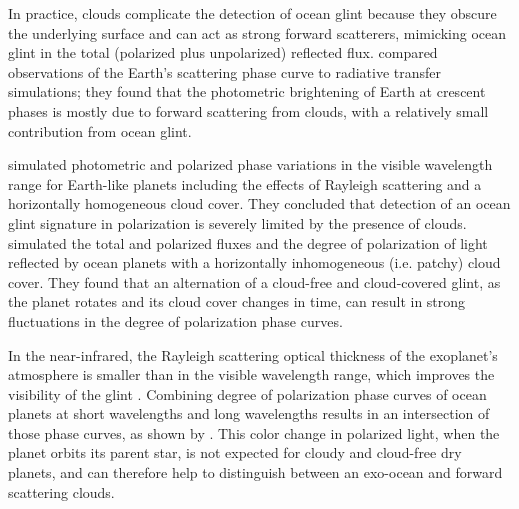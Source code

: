 \documentclass[
    usenatbib,
]{mnras}
\begin{document}


In practice, clouds complicate the detection of ocean glint because they obscure the underlying surface and can act as strong forward scatterers, mimicking ocean glint {\color{Green} in the total (polarized plus unpolarized) reflected flux}. \cite{2010ApJ...721L..67R} compared observations of the Earth's scattering phase curve to radiative transfer simulations; they found that the photometric brightening of Earth at crescent phases is mostly due to forward scattering from clouds, with a relatively small contribution from ocean glint.

\cite{Zugger_2010} simulated photometric and polarized phase variations {\color{Green} in the visible wavelength range} for Earth-like planets including the effects of %
{\color{Green} Rayleigh scattering and a horizontally homogeneous cloud cover. They concluded that detection of an ocean glint signature in polarization is severely limited by the presence of clouds.} %
{\color{Green} \citet{treesstam2019} simulated the total and polarized fluxes and the degree of polarization of light reflected by ocean planets with a horizontally inhomogeneous (i.e. patchy) cloud cover. They found that an alternation of a cloud-free and cloud-covered glint, as the planet rotates and its cloud cover changes in time, can result in strong fluctuations in the degree of polarization phase curves.}

{\color{Green}In the near-infrared, the Rayleigh scattering optical thickness of the exoplanet's atmosphere is smaller than in the visible wavelength range, which improves the visibility of the glint \citep{Zugger_2011}. Combining degree of polarization phase curves of ocean planets at short wavelengths and long wavelengths results in an intersection of those phase curves, as shown by \citet{treesstam2019}. This color change in polarized light, when the planet orbits its parent star, is not expected for cloudy and cloud-free dry planets, and can therefore help to distinguish between an exo-ocean and forward scattering clouds.}
\end{document}
